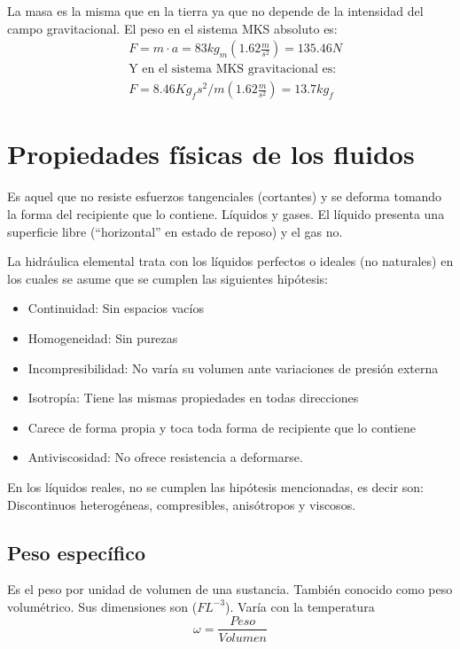 La masa es la misma que en la tierra ya que no depende de la intensidad del campo gravitacional.
El peso en el sistema MKS absoluto es: 
\begin{align*}
    &F=m\cdot a=83kg_m\left(1.62\frac{m}{s^2}\right)=135.46N\\
    &\text{Y en el sistema MKS gravitacional es: }\\
    &F=8.46Kg_fs^2/m\left(1.62\frac{m}{s^2}\right)=13.7kg_f
\end{align*}

\section{Propiedades físicas de los fluidos}

\begin{definition}[Fluido]
    Es aquel que no resiste esfuerzos tangenciales (cortantes) y se deforma tomando la forma del recipiente que lo contiene.
    Líquidos y gases. El líquido presenta una superficie libre (``horizontal'' en estado de reposo) y el gas no.
\end{definition}

La hidráulica elemental trata con los líquidos perfectos o ideales (no naturales) en los cuales se asume que se cumplen las siguientes hipótesis: 
\begin{itemize}
    \item Continuidad: Sin espacios vacíos
    \item Homogeneidad: Sin purezas
    \item Incompresibilidad: No varía su volumen ante variaciones de presión externa
    \item Isotropía: Tiene las mismas propiedades en todas direcciones
    \item Carece de forma propia y toca toda forma de recipiente que lo contiene 
    \item Antiviscosidad: No ofrece resistencia a deformarse.
\end{itemize}

En los líquidos reales, no se cumplen las hipótesis mencionadas, es decir son: Discontinuos heterogéneas, compresibles, anisótropos y viscosos.

\subsection{Peso específico }

\begin{definition}
    Es el peso por unidad de volumen de una sustancia. También conocido como peso volumétrico. Sus dimensiones son ($FL^{-3}$). Varía con la temperatura
    \begin{equation}
        \omega=\frac{Peso}{Volumen}
    \end{equation}
\end{definition}

